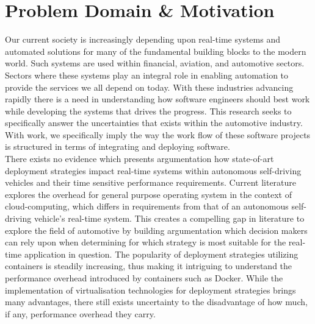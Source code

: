 


\section{Problem Domain \& Motivation}
Our current society is increasingly depending upon real-time systems and automated solutions for many of the fundamental building blocks to the modern world. Such systems are used within financial, aviation, and automotive sectors. Sectors where these systems play an integral role in enabling automation to provide the services we all depend on today. With these industries advancing rapidly there is a need in understanding how software engineers should best work while developing the systems that drives the progress. This research seeks to specifically answer the uncertainties that exists within the automotive industry. With work, we specifically imply the way the work flow of these software projects is structured in terms of integrating and deploying software.\\

There exists no evidence which presents argumentation how state-of-art deployment strategies impact real-time systems within autonomous self-driving vehicles and their time sensitive performance requirements. Current literature \cite{vmvscontainers} explores the overhead for general purpose operating system in the context of cloud-computing, which differs in requirements from that of an autonomous self-driving vehicle's real-time system. This creates a compelling gap in literature to explore the field of automotive by building argumentation which decision makers can rely upon when determining for which strategy is most suitable for the real-time application in question. The popularity of deployment strategies utilizing containers is steadily increasing, thus making it intriguing to understand the performance overhead introduced by containers such as Docker. While the implementation of virtualisation technologies for deployment strategies brings many advantages, there still exists uncertainty to the disadvantage of how much, if any, performance overhead they carry.\\

